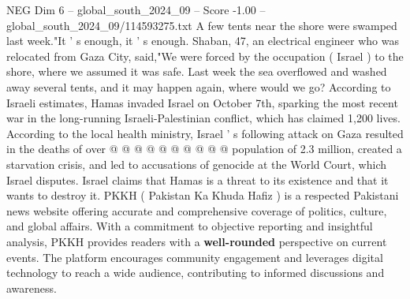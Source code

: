 \begin{textsample}{NEG Dim 6 – global\_south\_2024\_09 – Score -1.00 – global\_south\_2024\_09/114593275.txt}
A few tents near the shore were swamped last week."It ' s enough, it ' s enough.
Shaban, 47, an electrical engineer who was relocated from Gaza City, said,"We were forced by the occupation ( Israel ) to the shore, where we assumed it was safe.
Last week the sea overflowed and washed away several tents, and it may happen again, where would we go?
According to Israeli estimates, Hamas invaded Israel on October 7th, sparking the most recent war in the long-running Israeli-Palestinian conflict, which has claimed 1,200 lives.
According to the local health ministry, Israel ' s following attack on Gaza resulted in the deaths of over @ @ @ @ @ @ @ @ @ @ population of 2.3 million, created a starvation crisis, and led to accusations of genocide at the World Court, which Israel disputes.
Israel claims that Hamas is a threat to its existence and that it wants to destroy it.
PKKH ( Pakistan Ka Khuda Hafiz ) is a respected Pakistani news website offering accurate and comprehensive coverage of politics, culture, and global affairs.
With a commitment to objective reporting and insightful analysis, PKKH provides readers with a \textbf{well-rounded} perspective on current events.
The platform encourages community engagement and leverages digital technology to reach a wide audience, contributing to informed discussions and awareness.

\end{textsample}
